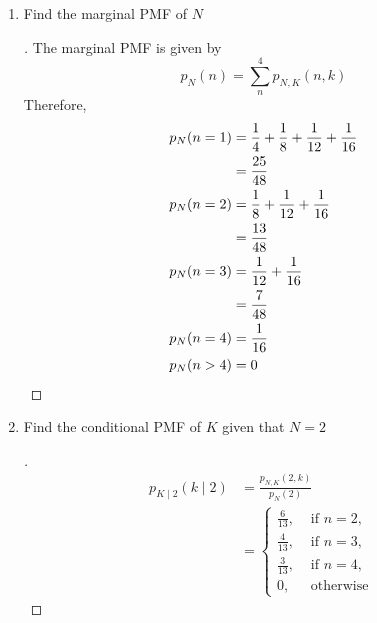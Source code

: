 \documentclass[paper=usletter, fontsize=12pt]{article}
\begin{document}
\begin{enumerate}[label=\textbf{\arabic*}.]
\begin{enumerate}[label=(\alph*)]
            \item Find the marginal PMF of $N$
            \begin{proof}[\unskip\nopunct]
                The marginal PMF is given by
                \begin{equation*}
                    p_N(n) = \sum_{n}^{4}p_{N, K}(n,k)
                \end{equation*}
                Therefore,
                \begingroup
                \addtolength{\jot}{1em}
                \begin{align*}
                    p_N(n=1) & = \frac{1}{4} + \frac{1}{8} + \frac{1}{12} + \frac{1}{16} \\
                    & = \frac{25}{48} \\
                    p_N(n=2) & = \frac{1}{8} + \frac{1}{12} + \frac{1}{16} \\
                    & = \frac{13}{48} \\
                    p_N(n=3) & = \frac{1}{12} + \frac{1}{16} \\
                    & = \frac{7}{48} \\
                    p_N(n=4) & = \frac{1}{16} \\
                    p_N(n > 4) & = 0 \qedhere
                \end{align*}
                \endgroup
            \end{proof}
            \vspace{0.2in}

            \item Find the conditional PMF of $K$ given that $N=2$
            \begin{proof}[\unskip\nopunct]
                \begingroup
                \addtolength{\jot}{1em}
                \begin{align*}
                    p_{K \mid 2}(k \mid 2) & = \frac{p_{N,K}(2,k)}{p_N(2)} \\
                    & = \begin{cases}
                        \frac{6}{13}, & \text{ if } n = 2, \\
                        \frac{4}{13}, & \text{ if } n = 3, \\
                        \frac{3}{13}, & \text{ if } n = 4, \\
                        0, & \text{ otherwise }
                    \end{cases}
                \end{align*}
                \endgroup \qedhere
            \end{proof}
            \vspace{0.2in}


\end{enumerate}
\end{enumerate}
\end{document}
